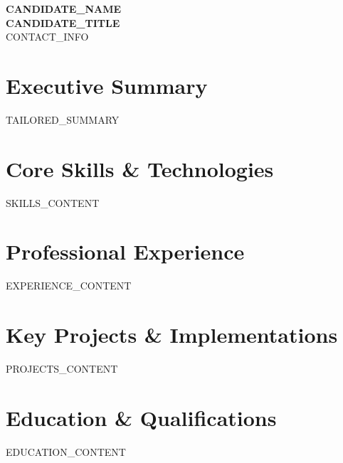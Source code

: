 \documentclass[letterpaper,10pt]{article}
\newcommand{\resumeSubHeadingListStart}{\begin{itemize}[leftmargin=0.15in, label={}]}
\newcommand{\resumeSubHeadingListEnd}{\end{itemize}}
\begin{document}
\begin{center}
    {\Huge \textbf{\scshape {{ CANDIDATE_NAME }}}} \\ \vspace{2pt}
    {\large \color{PrimaryColor} \textbf{{{ CANDIDATE_TITLE }}}} \\ \vspace{4pt}
    \small {{ CONTACT_INFO }}
\end{center}

\section{Executive Summary}
\small{
    {{ TAILORED_SUMMARY }}
}

\section{Core Skills \& Technologies}
\begin{itemize}[leftmargin=0.15in, label={}]
    \small{\item{
        {{ SKILLS_CONTENT }}
    }}
\end{itemize}

\section{Professional Experience}
\resumeSubHeadingListStart

{{ EXPERIENCE_CONTENT }}

\resumeSubHeadingListEnd

\section{Key Projects \& Implementations}
\resumeSubHeadingListStart

{{ PROJECTS_CONTENT }}

\resumeSubHeadingListEnd

\section{Education \& Qualifications}
\resumeSubHeadingListStart

{{ EDUCATION_CONTENT }}

\resumeSubHeadingListEnd
\end{document}
